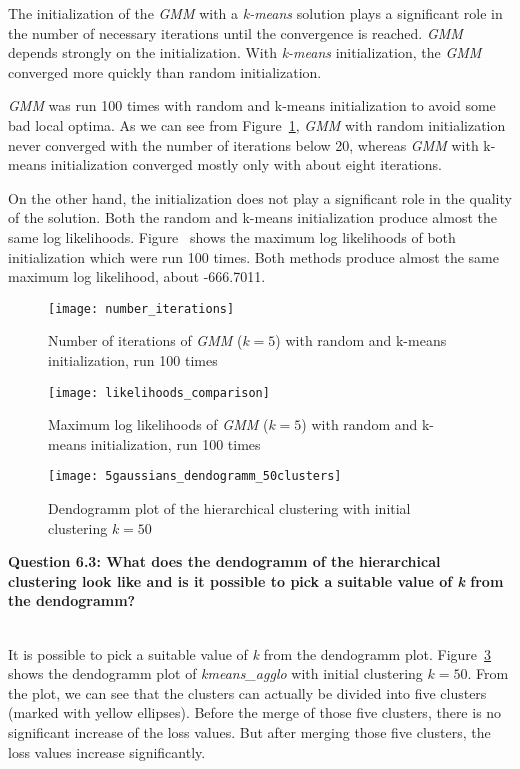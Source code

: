 The initialization of the \textit{GMM} with a \textit{k-means} solution plays a significant role in the number of necessary iterations until the convergence is reached. \textit{GMM} depends strongly on the initialization. With \textit{k-means} initialization, the \textit{GMM} converged more quickly than random initialization.

\textit{GMM} was run 100 times with random and k-means initialization to avoid some bad local optima. As we can see from Figure~\ref{fig:number_iterations}, \textit{GMM} with random initialization never converged with the number of iterations below 20, whereas \textit{GMM} with k-means initialization converged mostly only with about eight iterations.

On the other hand, the initialization does not play a significant role in the quality of the solution. Both the random and k-means initialization produce almost the same log likelihoods. Figure~ shows the maximum log likelihoods of both initialization which were run 100 times. Both methods produce almost the same maximum log likelihood, about -666.7011.

\begin{figure}[h!]
	\centering
	\texttt{[image: number\_iterations]}
	\caption{Number of iterations of \textit{GMM} ($k=5$) with random and k-means initialization, run 100 times}
	\label{fig:number_iterations}
\end{figure}

\begin{figure}[h!]
	\centering
	\texttt{[image: likelihoods\_comparison]}
	\caption{Maximum log likelihoods of \textit{GMM} ($k=5$) with random and k-means initialization, run 100 times}
	\label{fig:likelihoods_comparison}
\end{figure}

\begin{figure}[h!]
	\centering
	\texttt{[image: 5gaussians\_dendogramm\_50clusters]}
	\caption{Dendogramm plot of the hierarchical clustering with initial clustering $k=50$}
	\label{fig:5gaussians_dendogramm_50clusters}
\end{figure}

\newpage
{\raggedright \textbf{Question 6.3: What does the dendogramm of the hierarchical clustering look like and is it possible to pick a suitable value of \textit{k} from the dendogramm?}}\\

It is possible to pick a suitable value of \textit{k} from the dendogramm plot. Figure~\ref{fig:5gaussians_dendogramm_50clusters} shows the dendogramm plot of \textit{kmeans\_agglo} with initial clustering $k=50$. From the plot, we can see that the clusters can actually be divided into five clusters (marked with yellow ellipses). Before the merge of those five clusters, there is no significant increase of the loss values. But after merging those five clusters, the loss values increase significantly.

